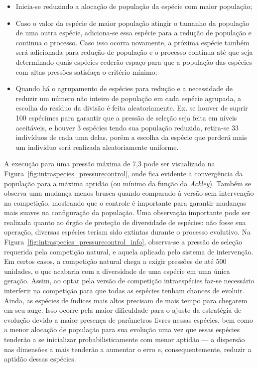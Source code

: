 \begin{itemize}
\item Inicia-se reduzindo a alocação de população da espécie com maior
população;
\item Caso o valor da espécie de maior população atingir o tamanho da
população de uma outra espécie, adiciona-se essa espécie para a
redução de população e continua o processo. Caso isso ocorra
novamente, a próxima espécie também será adicionada para redução de
população e o processo continua até que seja determinado quais
espécies cederão espaço para que a população das espécies com altas
pressões satisfaça o critério mínimo;
\item Quando há o agrupamento de espécies para redução e a
necessidade de reduzir um número não inteiro de população em cada
espécie agrupada, a escolha do resíduo da divisão é feita
aleatoriamente. Ex. se houver de suprir 100 espécimes para garantir que
a pressão de seleção seja feita em níveis aceitáveis, e houver 3
espécies tendo sua população reduzida, retira-se 33 indivíduos de
cada uma delas, porém a escolha da espécie que perderá mais um
individuo será realizada aleatoriamente uniforme.
\end{itemize}

A execução para uma pressão máxima de 7,3 pode ser visualizada na
Figura~\ref{fig:intraspecies_pressurecontrol}, onde fica evidente a
convergência da população para a máxima aptidão (ou mínimo da função
da \emph{Ackley}). Também se observa uma mudança menos brusca quando
comparado à versão sem intervenção na competição, mostrando que o
controle é importante para garantir mudanças mais suaves na
configuração da população. Uma observação importante pode ser
realizada quanto ao órgão de proteção de diversidade de espécies: não
fosse sua operação, diversas espécies teriam sido extintas durante o
processo evolutivo. Na
Figura~\ref{fig:intraspecies_pressurecontrol_info}, observa-se a
pressão de seleção requerida pela competição natural, e aquela
aplicada pelo sistema de intervenção. Em certos casos, a competição
natural chega a exigir pressões de até 500 unidades, o que acabaria
com a diversidade de uma espécie em uma única geração. Assim, ao optar
pela versão de competição intraespécies faz-se necessário interferir
na competição para que todas as espécies tenham chances de evoluir.
Ainda, as espécies de índices mais altos precisam de mais tempo para
chegarem em seu auge. Isso ocorre pela maior dificuldade para o ajuste
da estratégia de evolução devido a maior presença de parâmetros livres
nessas espécies, bem como a menor alocação de população para sua
evolução uma vez que essas espécies tenderão a se inicializar
probabilisticamente com menor aptidão --- a dispersão nas dimensões a
mais tenderão a aumentar o erro e, consequentemente, reduzir a aptidão
dessas espécies.

